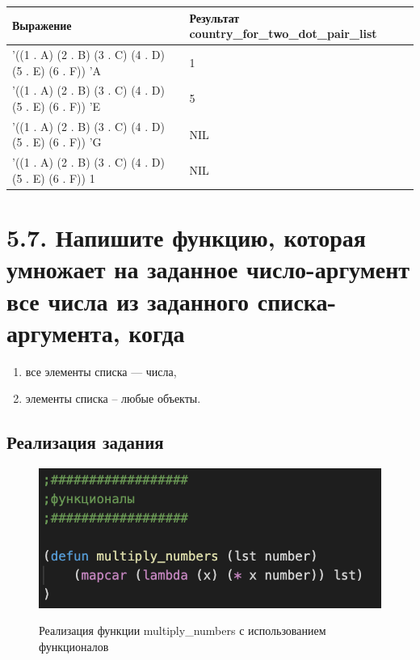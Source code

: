 \documentclass[a4paper,12pt]{article}
\begin{document}
\begin{table} [h!]
	\begin{center}
		\begin{tabular}{|l|l|}
			\hline
			{\bf  Выражение} & {\bf Результат country\_for\_two\_dot\_pair\_list}\\
			\hline
			{'((1 . A) (2 . B) (3 . C) (4 . D) (5 . E) (6 . F)) 'A} & 1\\
			\hline
			{'((1 . A) (2 . B) (3 . C) (4 . D) (5 . E) (6 . F)) 'E} & 5\\
			\hline
			{'((1 . A) (2 . B) (3 . C) (4 . D) (5 . E) (6 . F)) 'G} & NIL\\
			\hline
			{'((1 . A) (2 . B) (3 . C) (4 . D) (5 . E) (6 . F)) 1} & NIL\\
			\hline
		\end{tabular}  
		\label{m2}
	\end{center}
\end{table}
 	
 	\newpage
 	
 	\section*{5.7. Напишите функцию, которая умножает на заданное число-аргумент все числа
из заданного списка-аргумента, когда
 	}
 	
 	\begin{enumerate}
 		\item все элементы списка --- числа,
 		\item элементы списка -- любые объекты.
 	\end{enumerate}
 	
 	
 	\subsection*{Реализация задания}
 	
 	\begin{figure}[h!]
 		\begin{center}
 			{\includegraphics[scale = 1.3]{5.7f.png}}
 			\label{ris:5.7f}
 		\end{center}
 	\caption{Реализация функции multiply\_numbers с использованием функционалов}
 	\end{figure}
 
\end{document}
